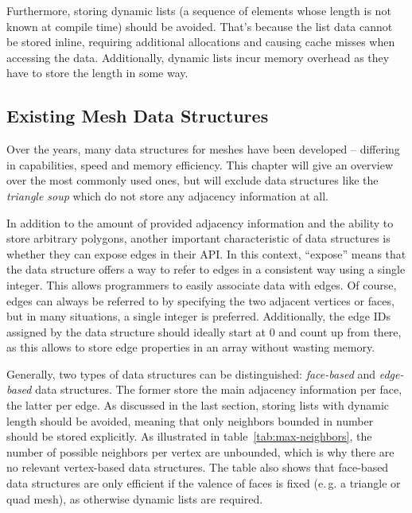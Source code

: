 Furthermore, storing dynamic lists (a sequence of elements whose length is not known at compile time) should be avoided.
That's because the list data cannot be stored inline, requiring additional allocations and causing cache misses when accessing the data.
Additionally, dynamic lists incur memory overhead as they have to store the length in some way.

\newpage
\subsection{Existing Mesh Data Structures}

Over the years, many data structures for meshes have been developed -- differing in capabilities, speed and memory efficiency.
This chapter will give an overview over the most commonly used ones, but will exclude data structures like the \emph{triangle soup} which do not store any adjacency information at all.

In addition to the amount of provided adjacency information and the ability to store arbitrary polygons, another important characteristic of data structures is whether they can expose edges in their API.
In this context, \enquote{expose} means that the data structure offers a way to refer to edges in a consistent way using a single integer.
This allows programmers to easily associate data with edges.
Of course, edges can always be referred to by specifying the two adjacent vertices or faces, but in many situations, a single integer is preferred.
Additionally, the edge IDs assigned by the data structure should ideally start at 0 and count up from there, as this allows to store edge properties in an array without wasting memory.

Generally, two types of data structures can be distinguished: \emph{face-based} and \emph{edge-based} data structures.
The former store the main adjacency information per face, the latter per edge.
As discussed in the last section, storing lists with dynamic length should be avoided, meaning that only neighbors bounded in number should be stored explicitly.
As illustrated in table~\ref{tab:max-neighbors}, the number of possible neighbors per vertex are unbounded, which is why there are no relevant vertex-based data structures.
The table also shows that face-based data structures are only efficient if the valence of faces is fixed (e.\,g. a triangle or quad mesh), as otherwise dynamic lists are required.

